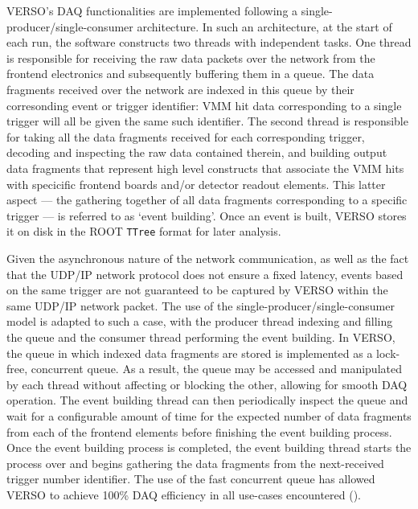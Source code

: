 VERSO's DAQ functionalities are implemented following a single-producer/single-consumer
architecture.
In such an architecture, at the start of each run, the software constructs two threads with independent
tasks.
One thread is responsible for receiving the raw data packets over the network from the
frontend electronics and subsequently buffering them in a queue.
The data fragments received over the network are indexed in this queue by their corresonding
event or trigger identifier: VMM hit data corresponding to a single trigger will all be given the
same such identifier.
The second thread is responsible for taking all the data fragments received for each corresponding
trigger, decoding and inspecting the raw data contained therein, and building output
data fragments that represent high level constructs that associate the VMM hits
with specicific frontend boards and/or detector readout elements.
This latter aspect --- the gathering together of all data fragments corresponding to a
specific trigger --- is referred to as `event building'.
Once an event is built, VERSO stores it on disk in the ROOT \texttt{TTree} format
for later analysis.

Given the asynchronous nature of the network communication, as well as the fact that the UDP/IP
network protocol does not ensure a fixed latency, events based on the same trigger
are not guaranteed to be captured by VERSO within the same UDP/IP network packet.
The use of the single-producer/single-consumer model is adapted to such a case, with
the producer thread indexing and filling the queue and the consumer thread performing the event building.
In VERSO, the queue in which indexed data fragments are stored is implemented
as a lock-free, concurrent queue.
As a result, the queue may be accessed and manipulated by each thread without affecting or blocking
the other, allowing for smooth DAQ operation.
The event building thread can then periodically inspect the queue and wait for a configurable amount of time for the expected
number of data fragments from each of the frontend elements before finishing
the event building process.
Once the event building process is completed,
the event building thread starts the process over and begins gathering the data fragments from the next-received trigger number identifier.
The use of the fast concurrent queue has allowed VERSO to achieve 100\% DAQ efficiency
in all use-cases encountered ({\color{red}{Section XXX for use-cases}}).



